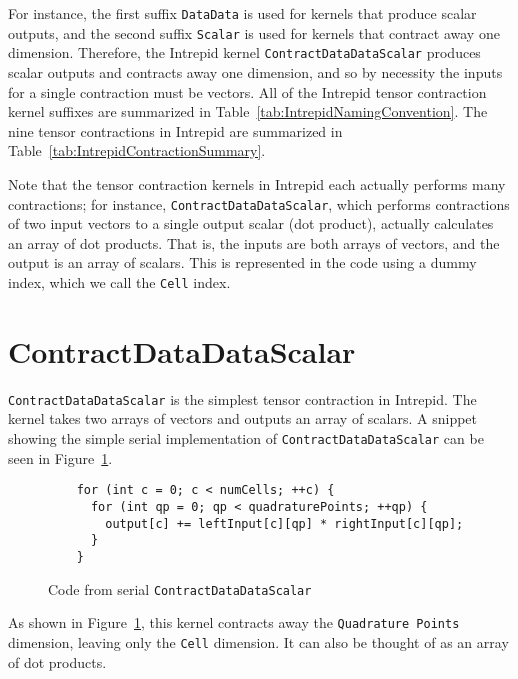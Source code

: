 For instance, the first suffix \texttt{DataData} is used for kernels that
produce scalar outputs, and the second suffix \texttt{Scalar} is used for
kernels that contract away one dimension.  Therefore, the Intrepid kernel
\texttt{ContractDataDataScalar} produces scalar outputs and contracts away one
dimension, and so by necessity the inputs for a single contraction must be
vectors.  All of the Intrepid tensor contraction kernel suffixes are summarized
in Table~\ref{tab:IntrepidNamingConvention}.  The nine tensor contractions in
Intrepid are summarized in Table~\ref{tab:IntrepidContractionSummary}.

Note that the tensor contraction kernels in Intrepid each actually performs many
contractions; for instance, \texttt{ContractDataDataScalar}, which performs
contractions of two input vectors to a single output scalar (dot product),
actually calculates an array of dot products.  That is, the inputs are both
arrays of vectors, and the output is an array of scalars.  This is represented
in the code using a dummy index, which we call the \texttt{Cell} index.

\section{ContractDataDataScalar}
\texttt{ContractDataDataScalar} is the simplest tensor contraction in Intrepid.
The kernel takes two arrays of vectors and outputs an array of scalars. A
snippet showing the simple serial implementation of
\texttt{ContractDataDataScalar} can be seen in
Figure~\ref{lst:ContractDataDataScalarSerial}.

\begin{figure}[ht]
    \begin{lstlisting}
    for (int c = 0; c < numCells; ++c) {
      for (int qp = 0; qp < quadraturePoints; ++qp) {
        output[c] += leftInput[c][qp] * rightInput[c][qp];
      }
    }
    \end{lstlisting}
\caption{Code from serial \texttt{ContractDataDataScalar}
\label{lst:ContractDataDataScalarSerial}} 
\end{figure}

As shown in 
Figure~\ref{lst:ContractDataDataScalarSerial}, this kernel contracts away the
\texttt{Quadrature Points} dimension, leaving only the \texttt{Cell} dimension.
It can also be thought of as an array of dot products.

